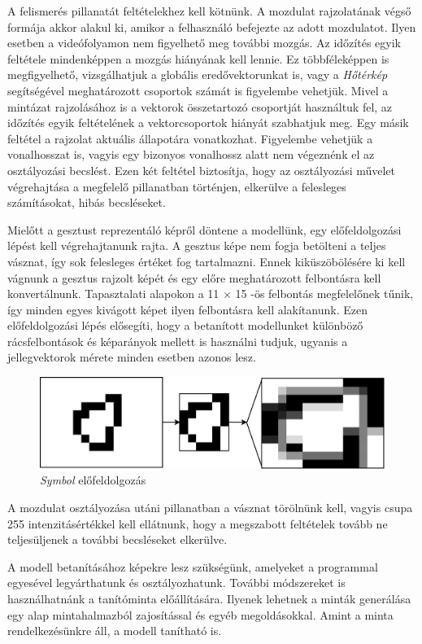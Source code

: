 A felismerés pillanatát feltételekhez kell kötnünk. A mozdulat rajzolatának végső formája akkor alakul ki, amikor a felhasználó befejezte az adott mozdulatot. Ilyen esetben a videófolyamon nem figyelhető meg további mozgás. Az időzítés egyik feltétele mindenképpen a mozgás hiányának kell lennie. Ez többféleképpen is megfigyelhető, vizsgálhatjuk a globális eredővektorunkat is, vagy a \textit{Hőtérkép} segítségével meghatározott csoportok számát is figyelembe vehetjük. Mivel a mintázat rajzolásához is a vektorok összetartozó csoportját használtuk fel, az időzítés egyik feltételének a vektorcsoportok hiányát szabhatjuk meg. Egy másik feltétel a rajzolat aktuális állapotára vonatkozhat. Figyelembe vehetjük a vonalhosszat is, vagyis egy bizonyos vonalhossz alatt nem végeznénk el az osztályozási becslést. Ezen két feltétel biztosítja, hogy az osztályozási művelet végrehajtása a megfelelő pillanatban történjen, elkerülve a felesleges számításokat, hibás becsléseket.

Mielőtt a gesztust reprezentáló képről döntene a modellünk, egy előfeldolgozási lépést kell végrehajtanunk rajta. A gesztus képe nem fogja betölteni a teljes vásznat, így sok felesleges értéket fog tartalmazni. Ennek kiküszöbölésére ki kell vágnunk a gesztus rajzolt képét és egy előre meghatározott felbontásra kell konvertálnunk. Tapasztalati alapokon a 11 $\times$ 15 -ös felbontás megfelelőnek tűnik, így minden egyes kivágott képet ilyen felbontásra kell alakítanunk. Ezen előfeldolgozási lépés elősegíti, hogy a betanított modellunket különböző rácsfelbontások és képarányok mellett is használni tudjuk, ugyanis a jellegvektorok mérete minden esetben azonos lesz.

\begin{figure}[h]
\centering
\includegraphics[width=10truecm]{images/crop_resize.png}
\caption{\textit{Symbol} előfeldolgozás}
\label{fig:symbol_pre}
\end{figure}

A mozdulat osztályozása utáni pillanatban a vásznat törölnünk kell, vagyis csupa 255 intenzitásértékkel kell ellátnunk, hogy a megszabott feltételek tovább ne teljesüljenek a további becsléseket elkerülve.

A modell betanításához képekre lesz szükségünk, amelyeket a programmal egyesével legyárthatunk és osztályozhatunk. További módszereket is használhatnánk a tanítóminta előállítására. Ilyenek lehetnek a minták generálása egy alap mintahalmazból zajosítással és egyéb megoldásokkal. Amint a minta rendelkezésünkre áll, a modell tanítható is.
